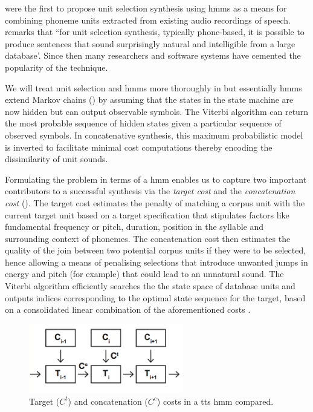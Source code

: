 \cite{Hunt1996} were the first to propose unit selection synthesis using \acrfull{hmm}s as a means for combining phoneme units extracted from existing audio recordings of speech. \cite{Conkie1999} remarks that ``for unit selection synthesis, typically phone-based, it is possible to produce sentences that sound surprisingly natural and intelligible from a large database'. Since then many researchers \citep{Conkie1999, balestri1999choose, schroder2001emotional, Tihelka2010, Lakkavalli2010} and software systems \citep{black1994chatr, beutnagel1999t, Young2002} have cemented the popularity of the technique.

We will treat unit selection and \acrshort{hmm}s more thoroughly in  but essentially \acrshort{hmm}s extend Markov chains () by assuming that the states in the state machine are now hidden but can output observable symbols. The Viterbi algorithm can return the most probable sequence of hidden states given a particular sequence of observed symbols. In concatenative synthesis, this maximum probabilistic model is inverted to facilitate minimal cost computations thereby encoding the dissimilarity of unit sounds.

Formulating the problem in terms of a \acrshort{hmm} enables us to capture two important contributors to a successful synthesis via the \textit{target cost} and the \textit{concatenation cost} (). The target cost estimates the penalty of matching a corpus unit with the current target unit based on a target specification that stipulates factors like fundamental frequency or pitch, duration, position in the syllable and surrounding context of phonemes. The concatenation cost then estimates the quality of the join between two potential corpus units if they were to be selected, hence allowing a means of penalising selections that introduce unwanted jumps in energy and pitch (for example) that could lead to an unnatural sound. The Viterbi algorithm efficiently searches the the state space of database units and outputs indices corresponding to the optimal state sequence for the target, based on a consolidated linear combination of the aforementioned costs \citep{Ob1995, Hunt1996}.

\begin{figure}
	\begin{center}
		\includegraphics[width=0.6\textwidth]{ch04_sota/figures/costs.png}
	\end{center}
	\caption[Target  and concatenation costs in a text-to-speech Hidden Markov Model compared]{Target ($C^{t}$) and concatenation ($C^{c}$) costs in a \acrshort{tts} \acrshort{hmm} compared.}
	\label{fig:target_concat_costs}
\end{figure}

